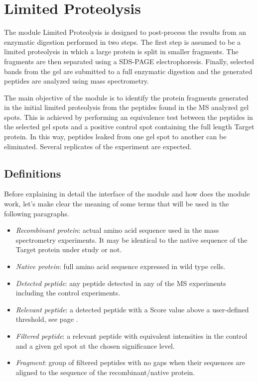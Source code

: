 \chapter{Limited Proteolysis}
\label{chap:limprot}

The module Limited Proteolysis is designed to post-process the results from an enzymatic
digestion performed in two steps. The first step is assumed to be a limited proteolysis
in which a large protein is split in smaller fragments. The fragments are then separated
using a SDS-PAGE electrophoresis. Finally, selected bands from the gel are submitted to
a full enzymatic digestion and the generated peptides are analyzed using mass spectrometry.

The main objective of the module is to identify the protein fragments generated in
the initial limited proteolysis from the peptides found in the MS analyzed gel spots.
This is achieved by performing an equivalence test\cite{Limentani2005a} between the
peptides in the selected gel spots and a positive control spot containing the full length
Target protein. In this way, peptides leaked from one gel spot to another can be
eliminated. Several replicates of the experiment are expected.

\section{Definitions}
\label{sec:limprotDefinitions}

Before explaining in detail the interface of the module and how does the module
work, let's make clear the meaning of some terms that will be used in the following
paragraphs.

\begin{itemize}
    \item \textit{Recombinant protein}: actual amino acid sequence used in the mass
    spectrometry experiments. It may be identical to the native sequence of the Target
    protein under study or not.
    \item \textit{Native protein}: full amino acid sequence expressed in wild type cells.
    \item \textit{Detected peptide}: any peptide detected in any of the MS
    experiments including the control experiments.
    \item \textit{Relevant peptide}: a detected peptide with a Score value above
    a user-defined threshold, see page \pageref{par:limprotScoreValue}.
    \item \textit{Filtered peptide}: a relevant peptide with equivalent intensities
    in the control and a given gel spot at the chosen significance level.\label{par:limprotFP}
    \item \textit{Fragment}: group of filtered peptides with no gaps when their
    sequences are aligned to the sequence of the recombinant/native protein.
\end{itemize}

